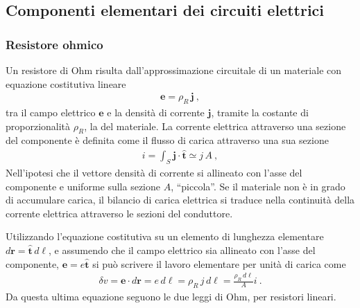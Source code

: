 \documentclass[letterpaper,10pt,english]{jupyterBook}
\begin{document}
\subsection{Componenti elementari dei circuiti elettrici}
\label{\detokenize{ch/circuits-electric-components:componenti-elementari-dei-circuiti-elettrici}}\label{\detokenize{ch/circuits-electric-components:classical-electromagnetism-circuits-electric-components}}\label{\detokenize{ch/circuits-electric-components::doc}}

\subsubsection{Resistore ohmico}
\label{\detokenize{ch/circuits-electric-components:resistore-ohmico}}
\sphinxAtStartPar
Un resistore di Ohm risulta dall’approssimazione circuitale di un materiale con equazione costitutiva lineare
\begin{equation*}
\begin{split}\mathbf{e} = \rho_R \, \mathbf{j} \ ,\end{split}
\end{equation*}
\sphinxAtStartPar
tra il campo elettrico \(\mathbf{e}\) e la densità di corrente \(\mathbf{j}\), tramite la costante di proporzionalità \(\rho_R\), la  del materiale. La corrente elettrica attraverso una sezione del componente è definita come il flusso di carica attraverso una sua sezione
\begin{equation*}
\begin{split}i = \int_S \mathbf{j} \cdot \hat{\mathbf{t}} \simeq j \, A \ ,\end{split}
\end{equation*}
\sphinxAtStartPar
Nell’ipotesi che il vettore densità di corrente si allineato con l’asse del componente e uniforme sulla sezione \(A\), “piccola”.
Se il materiale non è in grado di accumulare carica, il bilancio di carica elettrica si traduce nella continuità della corrente elettrica attraverso le sezioni del conduttore.

\sphinxAtStartPar
Utilizzando l’equazione costitutiva su un elemento di lunghezza elementare \(d\mathbf{r} =\hat{\mathbf{t}} \, d \ell \), e assumendo che il campo elettrico sia allineato con l’asse del componente, \(\mathbf{e} = e \hat{\mathbf{t}}\) si può scrivere il lavoro elementare per unità di carica come
\begin{equation*}
\begin{split}\delta v = \mathbf{e} \cdot d \mathbf{r} =  e \, d\ell = \rho_R \, j \, d\ell =  \frac{\rho_R \, d\ell}{A} i \ .\end{split}
\end{equation*}
\sphinxAtStartPar
Da questa ultima equazione seguono le due leggi di Ohm, per resistori lineari.
\end{document}
